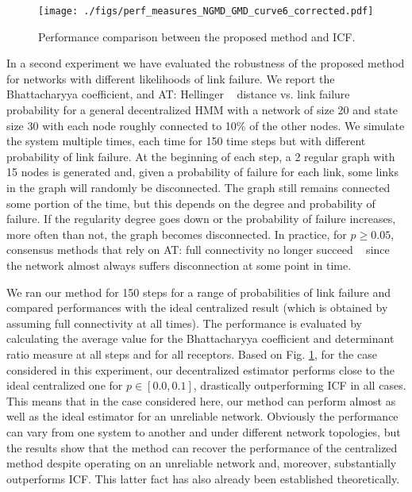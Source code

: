 \documentclass[conference]{IEEEtran}
\theoremstyle{remark}
\newcommand{\axx}[1]{{\color{blue} AT: #1  \ }}  %
\begin{document}
\begin{figure}[t]
	\centering
	{\texttt{[image: ./figs/perf\_measures\_NGMD\_GMD\_curve6\_corrected.pdf]}}
	\caption{ Performance comparison between the proposed method and ICF. }
	\label{fig:gcf2}
\end{figure}

In a second experiment we have evaluated the robustness of the proposed method 
for networks with different likelihoods of link failure. We report the 
Bhattacharyya coefficient, and \axx{Hellinger} distance vs. link failure 
probability 
for a general decentralized HMM with a network of size 20 and state size 30 
with each node roughly connected to 10\% of the other nodes. We simulate the 
system multiple times, each time for 150 time steps but with different 
probability of link failure. At the beginning of each step, a 2 regular graph 
with 15 nodes is generated and, given a probability of failure for each link, 
some links in the graph will randomly be disconnected. The graph still remains 
connected some portion of the time, but this depends on the degree and 
probability of failure. If the regularity degree goes down or the probability 
of failure increases, more often than not, the graph becomes disconnected. In 
practice, for $p\geq0.05$, consensus methods that rely on \axx{full 
connectivity  
no longer succeed} since the network almost always suffers disconnection at 
some 
point in time.

We ran our method for 150 steps for a range of probabilities of link failure 
and compared performances with the ideal centralized result (which is obtained 
by assuming full connectivity at all times). The performance is evaluated by 
calculating the average value for the Bhattacharyya coefficient and determinant 
ratio measure at all steps and for all receptors.  Based on Fig. 
\ref{fig:gcf2}, for the case considered in this experiment, our decentralized 
estimator performs close to the ideal centralized one for $p\in[0.0 ,0.1]$, 
drastically outperforming ICF in all cases. This means that in the case 
considered here, our method can perform almost as well as the ideal estimator 
for an unreliable  network. Obviously the performance can vary from one system 
to another and under different network topologies, but the results show that 
the method can recover 
the performance of the centralized method despite operating on an unreliable 
network and, moreover, 
substantially outperforms ICF. This latter fact has also already been 
established 
theoretically.
\end{document}
